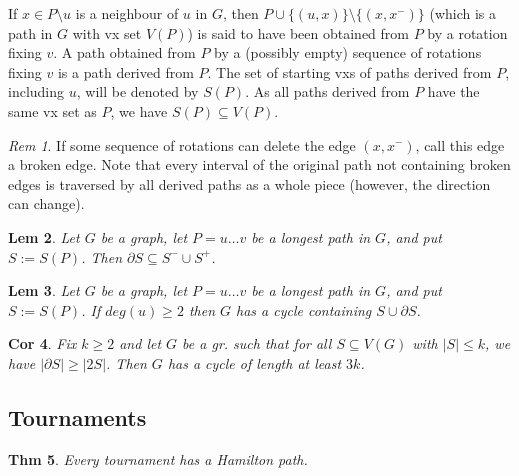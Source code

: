 \documentclass[11pt, fleqn, a4paper, landscape]{article}
\theoremstyle{plain} %
\newtheorem{thm}{Thm}
\newtheorem{lem}[thm]{Lem}
\newtheorem{cor}[thm]{Cor}
\theoremstyle{remark} %
\newtheorem{rem}[thm]{Rem}
\theoremstyle{definition} %
\newtheorem{defi}[thm]{Def}
\begin{document}
\begin{multicols}{5}
If $x \in P\setminus u$ is a neighbour of $u$ in $G$, then $P \cup \{(u, x)\}\setminus\{(x, x^-)\}$ (which is a path in $G$ with vx
set $V (P)$) is said to have been obtained from $P$ by a rotation fixing $v$. A path obtained from $P$ by a (possibly empty) sequence of rotations fixing $v$ is a path derived from $P$. The set of starting vxs of paths derived from $P$, including $u$, will be denoted by $S(P)$. As all paths derived from $P$ have the same vx set as $P$, we have $S(P) \subseteq V (P)$.

\begin{rem}
If some sequence of rotations can delete the edge $(x, x^-)$, call this edge a broken edge. Note that every interval of the original path not containing broken edges is traversed by all derived paths as a whole piece (however, the direction can change).
\end{rem}

\addtocounter{thm}{1}
\begin{lem}
Let $G$ be a graph, let $P = u \dots v$ be a longest path in $G$, and put $S := S(P)$. Then $\partial S \subseteq S^- \cup  S^+$.
\end{lem}

\begin{lem}
Let $G$ be a graph, let $P = u \dots v$ be a longest path in $G$, and put $S := S(P)$. If $deg(u) \ge 2$ then $ G$ has a cycle containing $S \cup \partial S$.
\end{lem}

\begin{cor}
Fix $k \ge 2$ and let $G$ be a gr. such that for all $S \subseteq V (G)$ with $|S|\le k$, we have $|\partial S|\ge |2S|$. Then $G$ has a cycle of length at least $3k$.
\end{cor}

\subsection{Tournaments}
\addtocounter{thm}{1}
\begin{thm}
Every tournament has a Hamilton path.
\end{thm}


\end{multicols}
\end{document}
